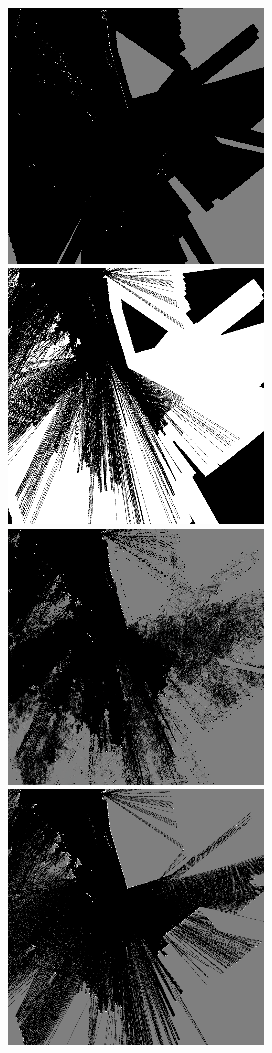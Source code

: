 \documentclass[sigconf]{aamas} %
\begin{document}
\begin{figure}[h!]
  \\%
  \includegraphics[width=\frac\linewidth]{./files/media/fr_campus_100p_10cm/00009_input.png}%
  \includegraphics[width=\frac\linewidth]{./files/media/fr_campus_100p_10cm/00009_mask.png}%
  \includegraphics[width=\frac\linewidth]{./files/media/fr_campus_100p_10cm/00009_output.png}%
  \includegraphics[width=\frac\linewidth]{./files/media/fr_campus_100p_10cm/00009_estimated.png}%

\end{figure}
\end{document}
